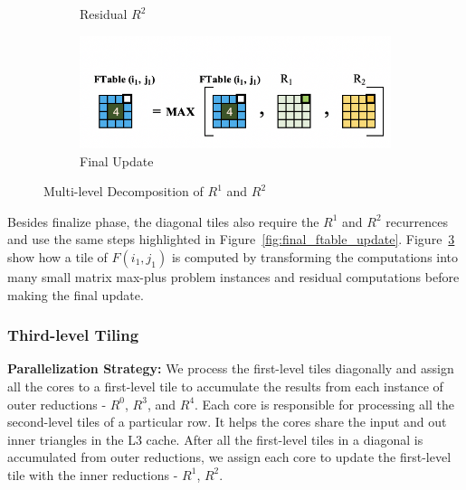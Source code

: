\begin{figure}
\begin{subfigure}[t]{0.22\textwidth}
\caption{Residual $R^{2}$}
\label{fig:mono_R_2}
\end{subfigure}
\vspace{0.5mm}
\begin{subfigure}[t]{0.22\textwidth}
\centering
\includegraphics[width=\textwidth, scale=0.30, trim=4 4 4 4,clip]{content/figures/ftable_final.png}
\caption{Final Update}
\label{fig:mono_final}
\end{subfigure}
\caption{Multi-level Decomposition of $R^{1}$ and $R^{2}$}
\label{fig:R_1_2_matrix_max_plus}
\end{figure}
Besides finalize phase, the diagonal tiles also require the $R^{1}$ and $R^{2}$ recurrences and use the same steps highlighted in Figure~\ref{fig:final_ftable_update}.
Figure~\ref{fig:R_1_2_matrix_max_plus} show how a tile of $F(i_{1}, j_{1})$ is computed by transforming the computations into many small matrix max-plus problem instances and residual computations before making the final update.


\subsubsection{Third-level Tiling}

\textbf{Parallelization Strategy:} We process the first-level tiles diagonally and assign all the cores to a first-level tile to accumulate the results from each instance of outer reductions - $R^{0}$, $R^{3}$, and $R^{4}$. Each core is responsible for processing all the second-level tiles of a particular row. It helps the cores share the input and out inner triangles in the L3 cache. After all the first-level tiles in a diagonal is accumulated from outer reductions, we assign each core to update the first-level tile with the inner reductions - $R^{1}$, $R^{2}$. 




